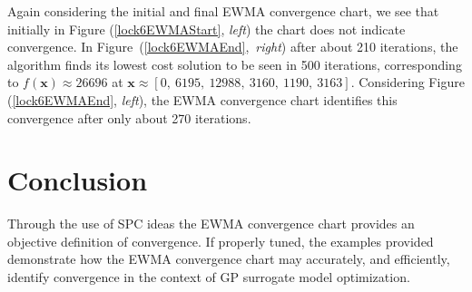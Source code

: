 \documentclass[12pt]{article}
\begin{document}
	Again considering the initial and final EWMA convergence chart, we see that initially in Figure (\ref{lock6EWMAStart}, {\it left}) the chart does not indicate convergence.
	In \mbox{Figure (\ref{lock6EWMAEnd}, {\it right})} after about 210 iterations, the algorithm finds its lowest cost solution to be seen in 500 iterations, corresponding to \mbox{$f(\bm{x})\approx26696$} at \mbox{$\bm{x} \approx \left[0,~6195,~12988,~3160,~1190,~3163\right]$}.
	Considering Figure (\ref{lock6EWMAEnd}, {\it left}), the EWMA convergence chart identifies this convergence after only about 270 iterations.
% 	

	
\clearpage
\doublespacing
% 	
% 	
\section{Conclusion}
% 	
% 	

%
%
Through the use of SPC ideas the EWMA convergence chart provides an objective definition of convergence. %
If properly tuned, the examples provided demonstrate how the  EWMA convergence chart may accurately, and efficiently, identify convergence in the context of GP surrogate model optimization.

%
%
\end{document}
